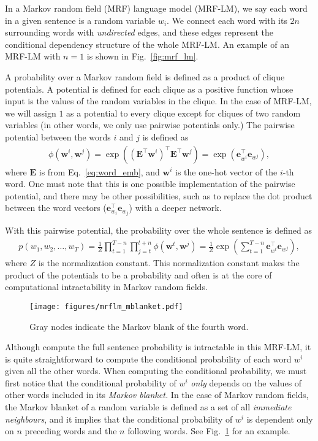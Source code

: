 \documentclass{report}
\newcommand{\vect}[1]{\mathbf{#1}}
\newcommand{\matr}[1]{\mathbf{#1}}
\newcommand{\ve}[0]{\vect{e}}
\newcommand{\vw}[0]{\vect{w}}
\newcommand{\mE}[0]{\matr{E}}
\begin{document}
In a Markov random field (MRF) language model (MRF-LM), we say each word in a
given sentence is a random variable $w_i$. We connect each word with its $2n$
surrounding words with {\em undirected} edges, and these edges represent the
conditional dependency structure of the whole MRF-LM. An example of an MRF-LM
with $n=1$ is shown in Fig.~\ref{fig:mrf_lm}.

A probability over a Markov random field is defined as a product of clique
potentials. A potential is defined for each clique as a positive function whose
input is the values of the random variables in the clique. In the case of
MRF-LM, we will assign $1$ as a potential to every clique except for cliques of
two random variables (in other words, we only use pairwise potentials only.) The
pairwise potential between the words $i$ and $j$ is defined as
\begin{align*}
    \phi(\vw^i, \vw^j) = \exp\left( (\mE^\top \vw^{i})^\top  \mE^\top \vw^j\right) = 
    \exp\left( \ve_{w^i}^\top \ve_{w^j} \right),
\end{align*}
where $\mE$ is from Eq.~\eqref{eq:word_emb}, and $\vw^i$ is the one-hot
vector of the $i$-th word. One must note that this is one possible
implementation of the pairwise potential, and there may be other possibilities,
such as to replace the dot product between the word vectors ($\ve_{w_i}^\top
\ve_{w_j}$) with a deeper network.

With this pairwise potential, the probability over the whole sentence is defined
as
\begin{align*}
    p(w_1, w_2, \ldots, w_T) = \frac{1}{Z} \prod_{t=1}^{T-n} \prod_{j=t}^{t+n}
    \phi(\vw^t, \vw^j) = \frac{1}{Z} \exp\left( 
        \sum_{t=1}^{T-n} \ve_{w^t}^\top \ve_{w^j}
    \right),
\end{align*}
where $Z$ is the normalization constant. This normalization constant makes the
product of the potentials to be a probability and often is at the core of
computational intractability in Markov random fields.

\begin{figure}[ht]
    \centering
    \texttt{[image: figures/mrflm\_mblanket.pdf]}
    \caption{Gray nodes indicate the Markov blank of the fourth word.}
    \label{fig:mrf_lm_mblanket}
\end{figure}

Although compute the full sentence probability is intractable in this MRF-LM, it
is quite straightforward to compute the conditional probability of each word
$w^i$ given all the other words. When computing the conditional probability, we
must first notice that the conditional probability of $w^i$ {\em only} depends
on the values of other words included in its {\em Markov blanket.} In the case
of Markov random fields, the Markov blanket of a random variable is defined as a
set of all {\em immediate neighbours}, and it implies that the conditional
probability of $w^i$ is dependent only on $n$ preceding words and the $n$
following words. See Fig.~\ref{fig:mrf_lm_mblanket} for an example.
\end{document}
